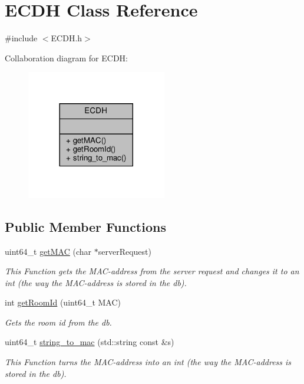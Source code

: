 \hypertarget{classECDH}{}\section{E\+C\+DH Class Reference}
\label{classECDH}


{\ttfamily \#include $<$E\+C\+D\+H.\+h$>$}



Collaboration diagram for E\+C\+DH\+:\nopagebreak
\begin{figure}[H]
\begin{center}
\leavevmode
\includegraphics[width=173pt]{classECDH__coll__graph}
\end{center}
\end{figure}
\subsection*{Public Member Functions}
\begin{DoxyCompactItemize}
\item 
uint64\+\_\+t \hyperlink{classECDH_a3ff5f397f1198e2f1daa7689434f338c}{get\+M\+AC} (char $\ast$server\+Request)
\begin{DoxyCompactList}\small\item\em This Function gets the M\+A\+C-\/address from the server request and changes it to an int (the way the M\+A\+C-\/address is stored in the db). \end{DoxyCompactList}\item 
int \hyperlink{classECDH_ac552676079ed12da22501ead4d15500b}{get\+Room\+Id} (uint64\+\_\+t M\+AC)
\begin{DoxyCompactList}\small\item\em Gets the room id from the db. \end{DoxyCompactList}\item 
uint64\+\_\+t \hyperlink{classECDH_a0b5fb1d5817ba51fe4e055190c3c88f2}{string\+\_\+to\+\_\+mac} (std\+::string const \&s)
\begin{DoxyCompactList}\small\item\em This Function turns the M\+A\+C-\/address into an int (the way the M\+A\+C-\/address is stored in the db). \end{DoxyCompactList}\end{DoxyCompactItemize}


